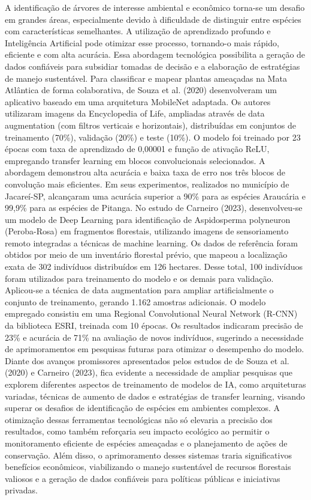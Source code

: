 A identificação de árvores de interesse ambiental e econômico torna-se um desafio em grandes áreas, especialmente devido à dificuldade de distinguir entre espécies com características semelhantes. A utilização de aprendizado profundo e Inteligência Artificial pode otimizar esse processo, tornando-o mais rápido, eficiente e com alta acurácia. Essa abordagem tecnológica possibilita a geração de dados confiáveis para subsidiar tomadas de decisão e a elaboração de estratégias de manejo sustentável.
Para classificar e mapear plantas ameaçadas na Mata Atlântica de forma colaborativa, de Souza et al. (2020) desenvolveram um aplicativo baseado em uma arquitetura MobileNet adaptada. Os autores utilizaram imagens da Encyclopedia of Life, ampliadas através de data augmentation (com filtros verticais e horizontais), distribuídas em conjuntos de treinamento (70\%), validação (20\%) e teste (10\%). O modelo foi treinado por 23 épocas com taxa de aprendizado de 0,00001 e função de ativação ReLU, empregando transfer learning em blocos convolucionais selecionados. A abordagem demonstrou alta acurácia e baixa taxa de erro nos três blocos de convolução mais eficientes. Em seus experimentos, realizados no município de Jacareí-SP, alcançaram uma acurácia superior a 90\% para as espécies Araucária e 99,9\% para as espécies de Pitanga.
No estudo de Carneiro (2023), desenvolveu-se um modelo de Deep Learning para identificação de Aspidosperma polyneuron (Peroba-Rosa) em fragmentos florestais, utilizando imagens de sensoriamento remoto integradas a técnicas de machine learning. Os dados de referência foram obtidos por meio de um inventário florestal prévio, que mapeou a localização exata de 302 indivíduos distribuídos em 126 hectares. Desse total, 100 indivíduos foram utilizados para treinamento do modelo e os demais para validação. Aplicou-se a técnica de data augmentation para ampliar artificialmente o conjunto de treinamento, gerando 1.162 amostras adicionais. O modelo empregado consistiu em uma Regional Convolutional Neural Network (R-CNN) da biblioteca ESRI, treinada com 10 épocas. Os resultados indicaram precisão de 23\% e acurácia de 71\% na avaliação de novos indivíduos, sugerindo a necessidade de aprimoramentos em pesquisas futuras para otimizar o desempenho do modelo.
Diante dos avanços promissores apresentados pelos estudos de de Souza et al. (2020) e Carneiro (2023), fica evidente a necessidade de ampliar pesquisas que explorem diferentes aspectos de treinamento de modelos de IA, como arquiteturas variadas, técnicas de aumento de dados e estratégias de transfer learning, visando superar os desafios de identificação de espécies em ambientes complexos. A otimização dessas ferramentas tecnológicas não só elevaria a precisão dos resultados, como também reforçaria seu impacto ecológico ao permitir o monitoramento eficiente de espécies ameaçadas e o planejamento de ações de conservação. Além disso, o aprimoramento desses sistemas traria significativos benefícios econômicos, viabilizando o manejo sustentável de recursos florestais valiosos e a geração de dados confiáveis para políticas públicas e iniciativas privadas.

